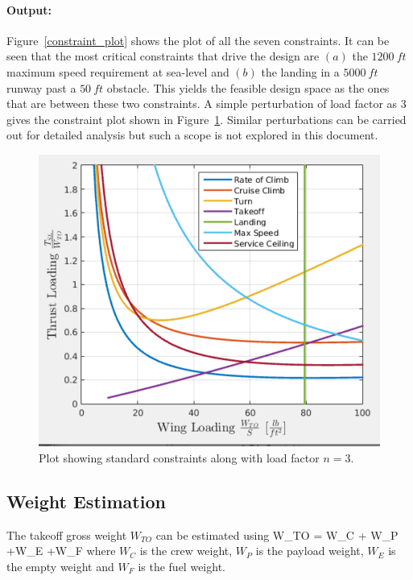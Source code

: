 \documentclass[pdftex,11pt,letter]{article}
\begin{document}
\paragraph{Output:}
Figure~\ref{constraint_plot} shows the plot of all the seven constraints. It can be seen that the most critical constraints that drive the design are $(a)$ the $1200~ft$ maximum speed requirement at sea-level and $(b)$ the landing in a $5000~ft$ runway past a $50~ft$ obstacle. This yields the feasible design space as the ones that are between these two constraints. A simple perturbation of load factor as 3 gives the constraint plot shown in Figure~\ref{load}. Similar perturbations can be carried out for detailed analysis but such a scope is not explored in this document.
\begin{figure}[h!]
\centering
	\includegraphics[scale=0.6]{figures/load3.pdf}
        \caption{Plot showing standard constraints along with load factor $n=3$.}
\label{load}
\end{figure}

\subsection{Weight Estimation}
The  takeoff gross weight $W_{TO}$ can be estimated using
\beq\label{eq:takeoff_weight}
W_{TO} = W_C + W_P +W_E +W_F
\eeq
where $W_C$ is the crew weight, $W_P$ is the payload weight, $W_E$ is the empty weight and $W_F$ is the fuel weight.
\end{document}
